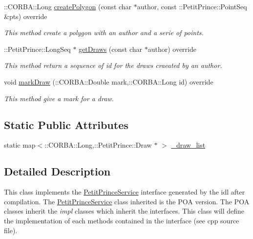 \begin{DoxyCompactItemize}
\+::C\+O\+R\+B\+A\+::\+Long \hyperlink{class_petit_prince_service_impl_a5f7839fea87678e071f39ec019e7b306}{create\+Polygon} (const char $\ast$author, const \+::Petit\+Prince\+::\+Point\+Seq \&pts) override
\begin{DoxyCompactList}\small\item\em This method create a polygon with an author and a serie of points. \end{DoxyCompactList}\item 
\+::Petit\+Prince\+::\+Long\+Seq $\ast$ \hyperlink{class_petit_prince_service_impl_a97ed62c5a6c2fb4d86a23bde084e3c82}{get\+Draws} (const char $\ast$author) override
\begin{DoxyCompactList}\small\item\em This method return a sequence of id for the draws craeated by an author. \end{DoxyCompactList}\item 
void \hyperlink{class_petit_prince_service_impl_abe85dc1a7c705dec3aeac5c56e2f9e98}{mark\+Draw} (\+::C\+O\+R\+B\+A\+::\+Double mark,\+::C\+O\+R\+B\+A\+::\+Long id) override
\begin{DoxyCompactList}\small\item\em This method give a mark for a draw. \end{DoxyCompactList}\end{DoxyCompactItemize}
\subsection*{Static Public Attributes}
\begin{DoxyCompactItemize}
\item 
static map$<$\+::C\+O\+R\+B\+A\+::\+Long,\+::Petit\+Prince\+::\+Draw $\ast$ $>$ \hyperlink{class_petit_prince_service_impl_ac469e25a69375c26d3d6ec514fc7bb5b}{\+\_\+draw\+\_\+list}
\end{DoxyCompactItemize}


\subsection{Detailed Description}
This class implements the \hyperlink{class_petit_prince_service}{Petit\+Prince\+Service} interface generated by the idl after compilation. The \hyperlink{class_petit_prince_service}{Petit\+Prince\+Service} class inherited is the P\+OA version. The P\+OA classes inherit the {\itshape impl} classes which inherit the interfaces. This class will define the implementation of each methods contained in the interface (see cpp source file). 

